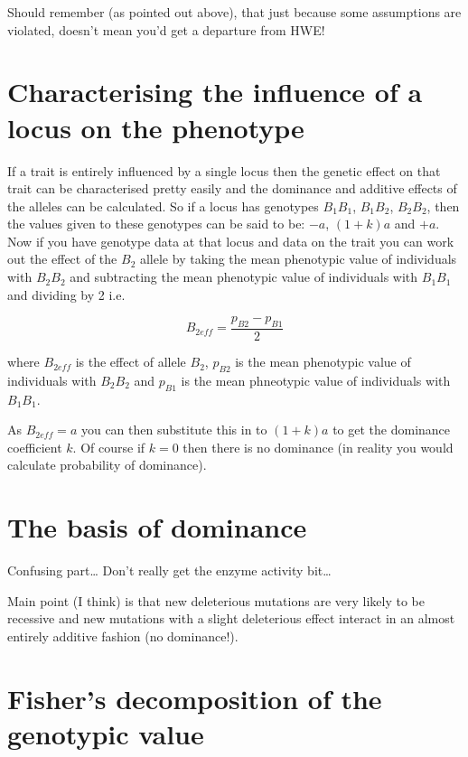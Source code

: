\documentclass[
]{book}
\begin{document}
Should remember (as pointed out above), that just because some assumptions are violated, doesn't mean you'd get a departure from HWE!

\hypertarget{characterising-the-influence-of-a-locus-on-the-phenotype}{%
\section{Characterising the influence of a locus on the phenotype}\label{characterising-the-influence-of-a-locus-on-the-phenotype}}

If a trait is entirely influenced by a single locus then the genetic effect on that trait can be characterised pretty easily and the dominance and additive effects of the alleles can be calculated. So if a locus has genotypes \(B_1B_1\), \(B_1B_2\), \(B_2B_2\), then the values given to these genotypes can be said to be: \(-a\), \((1 + k)a\) and \(+a\). Now if you have genotype data at that locus and data on the trait you can work out the effect of the \(B_2\) allele by taking the mean phenotypic value of individuals with \(B_2B_2\) and subtracting the mean phenotypic value of individuals with \(B_1B_1\) and dividing by 2 i.e.

\[ B_{2eff} = \frac{p_{B2} - p_{B1}} {2} \]

where \(B_{2eff}\) is the effect of allele \(B_2\), \(p_{B2}\) is the mean phenotypic value of individuals with \(B_2B_2\) and \(p_{B1}\) is the mean phneotypic value of individuals with \(B_1B_1\).

As \(B_{2eff} = a\) you can then substitute this in to \((1 + k)a\) to get the dominance coefficient \(k\). Of course if \(k = 0\) then there is no dominance (in reality you would calculate probability of dominance).

\hypertarget{the-basis-of-dominance}{%
\section{The basis of dominance}\label{the-basis-of-dominance}}

Confusing part\ldots{} Don't really get the enzyme activity bit\ldots{}

Main point (I think) is that new deleterious mutations are very likely to be recessive and new mutations with a slight deleterious effect interact in an almost entirely additive fashion (no dominance!).

\hypertarget{fishers-decomposition-of-the-genotypic-value}{%
\section{Fisher's decomposition of the genotypic value}\label{fishers-decomposition-of-the-genotypic-value}}
\end{document}
